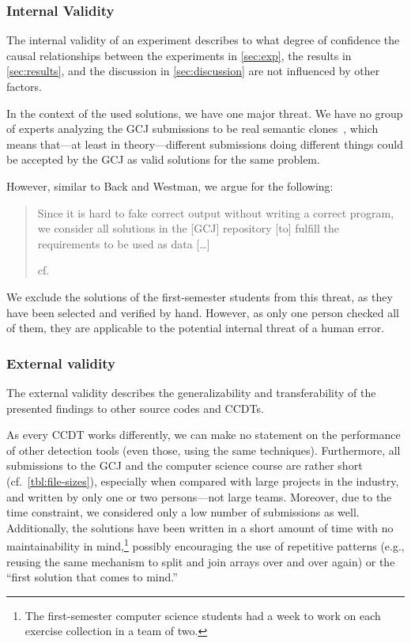 \documentclass[10pt,journal,compsoc]{IEEEtran}
\def\todo#1{\textcolor{brown!80!yellow!70!black!90!red}{[\textsc{todo}: \textsf{#1}]}}
\begin{document}
\subsubsection{Internal Validity}
The internal validity of an experiment describes to what degree of confidence the
causal relationships between the experiments in \cref{sec:exp}, the results in \cref{sec:results}, and the discussion in \cref{sec:discussion} are not influenced by other factors.

In the context of the used solutions, we have one major threat.
We have no group of experts analyzing the GCJ submissions to be real semantic clones~\cite{svajlenko2014towards}, which means that---at least in theory---different submissions doing different things could be accepted by the GCJ as valid solutions for the same problem.

However, similar to Back and Westman, we argue for the following:
\blockquote[cf.~{\cite[p.~10]{ComparingProgrammingLanguages2017}}]{Since it is hard to fake correct output without writing a correct program, we consider all solutions in the [GCJ] repository [to] fulfill the
requirements to be used as data [\ldots]}

We exclude the solutions of the first-semester students from this threat, as they have been selected and verified by hand. However, as only one person checked all of them, they are applicable to the potential internal threat of a human error.


\subsubsection{External validity}
The external validity describes the generalizability and transferability
of the presented findings to other source codes and CCDTs.

As every CCDT works differently, we can make no statement on the performance of other detection tools (even those, using the same techniques).
Furthermore, all submissions to the GCJ and the computer science course are rather short (cf.~\cref{tbl:file-sizes}), especially when compared with large projects in the industry, and written by only one or two persons---not large teams. Moreover, due to the time constraint, we considered only a low number of submissions as well.
Additionally, the solutions have been written in a short amount of time with no maintainability in mind,\footnote{The first-semester computer science students had a week to work on each exercise collection in a team of two.} possibly encouraging the use of repetitive patterns (e.g., reusing the same mechanism to split and join arrays over and over again) or the \enquote{first solution that comes to mind.}
\end{document}
